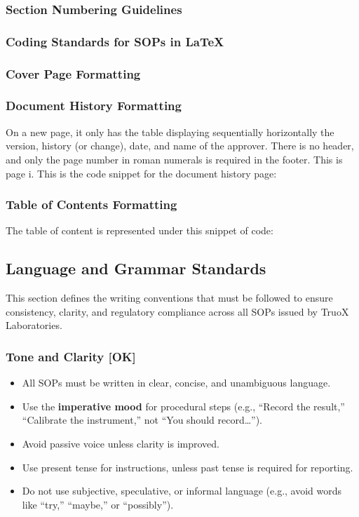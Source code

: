 \documentclass[11pt]{article}
\begin{document}
\subsubsection{Section Numbering Guidelines}

\subsubsection{Coding Standards for SOPs in LaTeX}

\subsubsection{Cover Page Formatting}

\subsubsection{Document History Formatting}
On a new page, it only has the table displaying sequentially horizontally the version, history (or change), date, and name of the approver. There is no header, and only the page number in roman numerals is required in the footer. This is page i. This is the code snippet for the document history page:

\subsubsection{Table of Contents Formatting}
The table of content is represented under this snippet of code:

\subsection{Language and Grammar Standards}
This section defines the writing conventions that must be followed to ensure consistency, clarity, and regulatory compliance across all SOPs issued by TruoX Laboratories.

\subsubsection{Tone and Clarity [OK]}
\begin{itemize}
    \item All SOPs must be written in clear, concise, and unambiguous language.
    \item Use the \textbf{imperative mood} for procedural steps (e.g., “Record the result,” “Calibrate the instrument,” not “You should record…”).
    \item Avoid passive voice unless clarity is improved.
    \item Use present tense for instructions, unless past tense is required for reporting.
    \item Do not use subjective, speculative, or informal language (e.g., avoid words like “try,” “maybe,” or “possibly”).
\end{itemize}
\end{document}
